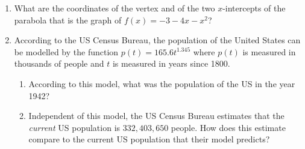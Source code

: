 \begin{enumerate}

    \item 
        What are the coordinates of the vertex
        and of the two \(x\)-intercepts of the parabola
        that is the graph of \(f(x) = -3-4x-x^2\)?
        \vfill\null
        \vfill\null

    \item 
        According to the US Census Bureau,
        the population of the United States
        can be modelled by the function \(p(t) = 165.6t^{1.345}\)
        where \(p(t)\) is measured in thousands of people
        and \(t\) is measured in years since 1800.
        \begin{enumerate}
            \item
                According to this model, what was the population
                of the US in the year 1942?
                \vfill\null
            \item 
                Independent of this model, 
                the US Census Bureau estimates 
                that the \emph{current} US population 
                is \(332,403,650\) people.
                How does this estimate compare to the 
                current US population that their model predicts?
                \vfill\null
                \vfill\null
        \end{enumerate}

        \newpage


\end{enumerate}
